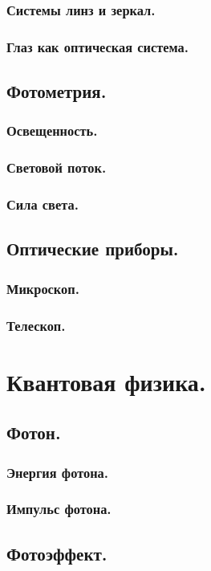 \documentclass{article}
\begin{document}
        \subsubsection{Системы линз и зеркал.}
        \subsubsection{Глаз как оптическая система.}
    \subsection{Фотометрия.}
        \subsubsection{Освещенность.}
        \subsubsection{Световой поток.}
        \subsubsection{Сила света.}
    \subsection{Оптические приборы.}
        \subsubsection{Микроскоп.}
        \subsubsection{Телескоп.}
\section{Квантовая физика.}
    \subsection{Фотон.}
        \subsubsection{Энергия фотона.}
        \subsubsection{Импульс фотона.}
    \subsection{Фотоэффект.}
\end{document}
